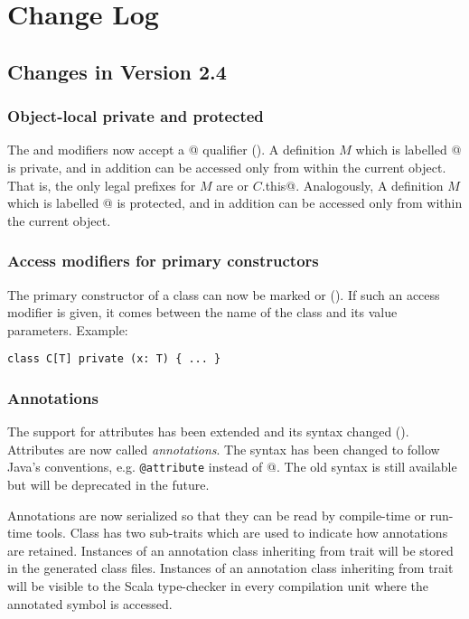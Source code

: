 
\chapter{Change Log}

\section{Changes in Version 2.4}

\subsection*{Object-local private and protected}

The \lstinline@private@ and \lstinline@protected@ modifiers now accept
a \lstinline@[this]@ qualifier (). A definition $M$ which is labelled
\lstinline@private[this]@ is private, and in addition can be accessed
only from within the current object. That is, the only legal prefixes
for $M$ are \lstinline@this@ or \lstinline@$C$.this@.  Analogously, A
definition $M$ which is labelled \lstinline@protected[this]@ is
protected, and in addition can be accessed only from within the
current object.

\subsection*{Access modifiers for primary constructors}

The primary constructor of a class can now be marked  or
 (). If such an access modifier is given, it comes
between the name of the class and its value parameters. Example:
\begin{lstlisting}
class C[T] private (x: T) { ... }
\end{lstlisting}

\subsection*{Annotations}

The support for attributes has been extended and its syntax changed
().  Attributes are now called {\em
  annotations}. The syntax has been changed to follow Java's
conventions, e.g. \lstinline^@attribute^ instead of
\lstinline@[attribute]@. The old syntax is still available but will be
deprecated in the future.

Annotations are now serialized so that they can be read by
compile-time or run-time tools. Class  has two
sub-traits which are used to indicate how annotations are
retained. Instances of an annotation class inheriting from trait
 will be stored in the generated class
files. Instances of an annotation class inheriting from trait
 will be visible to the Scala type-checker
in every compilation unit where the annotated symbol is accessed. 

